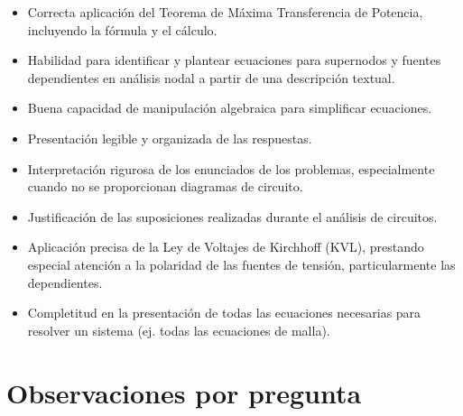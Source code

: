 \documentclass[11pt,a4paper]{article}
\begin{document}
\vspace{4pt}
\begin{minipage}[t]{0.48\linewidth}
  \begin{tcolorbox}[cajaFortaleza, title={Fortalezas}]
\begin{itemize}[leftmargin=1.5em, itemsep=2pt]
  \item Correcta aplicación del Teorema de Máxima Transferencia de Potencia, incluyendo la fórmula y el cálculo.
  \item Habilidad para identificar y plantear ecuaciones para supernodos y fuentes dependientes en análisis nodal a partir de una descripción textual.
  \item Buena capacidad de manipulación algebraica para simplificar ecuaciones.
  \item Presentación legible y organizada de las respuestas.
\end{itemize}
  \end{tcolorbox}
\end{minipage}
\hfill
\begin{minipage}[t]{0.48\linewidth}
  \begin{tcolorbox}[cajaMejora, title={Areas de mejora}]
\begin{itemize}[leftmargin=1.5em, itemsep=2pt]
  \item Interpretación rigurosa de los enunciados de los problemas, especialmente cuando no se proporcionan diagramas de circuito.
  \item Justificación de las suposiciones realizadas durante el análisis de circuitos.
  \item Aplicación precisa de la Ley de Voltajes de Kirchhoff (KVL), prestando especial atención a la polaridad de las fuentes de tensión, particularmente las dependientes.
  \item Completitud en la presentación de todas las ecuaciones necesarias para resolver un sistema (ej. todas las ecuaciones de malla).
\end{itemize}
  \end{tcolorbox}
\end{minipage}

\section*{Observaciones por pregunta}
\end{document}
